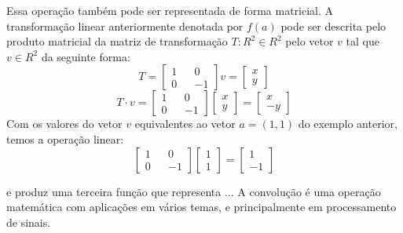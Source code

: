 Essa operação também pode ser representada de forma matricial. A transformação linear anteriormente denotada por $f(a)$ pode ser descrita pelo produto matricial da matriz de transformação $T : R^2 \in R^2$ pelo vetor $v$ tal que $v \in R^2$ da seguinte forma:
$$T = \begin{bmatrix}1 && 0 \\ 0 && -1\end{bmatrix} v = \begin{bmatrix}x \\ y\end{bmatrix}$$ 
$$T\cdot v = \begin{bmatrix}1 && 0 \\ 0 && -1\end{bmatrix}\begin{bmatrix}x \\ y\end{bmatrix} = \begin{bmatrix}x \\ -y\end{bmatrix}$$
Com os valores do vetor $v$ equivalentes ao vetor $a = (1,1)$ do exemplo anterior, temos a operação linear:
$$\begin{bmatrix}1 && 0 \\ 0 && -1\end{bmatrix}\begin{bmatrix}1 \\ 1\end{bmatrix} = \begin{bmatrix}1 \\ -1\end{bmatrix}$$






e produz uma terceira função que representa ... A convolução é uma operação matemática com aplicações em vários temas, e principalmente em processamento de sinais.






